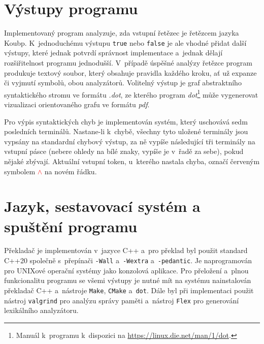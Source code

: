 \section{Výstupy programu}
Implementovaný program analyzuje, zda vstupní řetězec je řetězcem jazyka Koubp.
K~jednoduchému výstupu \texttt{true} nebo \texttt{false} je ale vhodné přidat další výstupy, které jednak potvrdí správnost implementace a~jednak dělají rozšiřitelnost programu jednodušší.
V~případě úspěšné analýzy řetězce program produkuje textový soubor, který obsahuje pravidla každého kroku, ať už expanze či vyjmutí symbolů, obou analyzátorů.
Volitelný výstup je graf abstraktního syntaktického stromu ve formátu \emph{.dot}, ze kterého program \emph{dot}\footnote{Manuál k~programu k~dispozici na \href{https://linux.die.net/man/1/dot}{https://linux.die.net/man/1/dot}.} může vygenerovat vizualizaci orientovaného grafu ve formátu \emph{pdf}.

Pro výpis syntaktických chyb je implementován systém, který uschovává sedm posledních terminálů.
Nastane-li k~chybě, všechny tyto uložené terminály jsou vypsány na standardní chybový výstup, za ně vypíše následující tři terminály na vstupní pásce (nebere ohledy na bílé znaky, vypíše je v~řadě za sebe), pokud nějaké zbývají.
Aktuální vstupní token, u~kterého nastala chyba, označí červeným symbolem \textcolor{red}{$\wedge$} na novém řádku.

\section{Jazyk, sestavovací systém a spuštění programu}
Překladač je implementován v~jazyce C++ a~pro překlad byl použit standard C++20 společně s~přepínači \texttt{-Wall} a~\texttt{-Wextra} a~\texttt{-pedantic}.
Je naprogramován pro UNIXové operační systémy jako konzolová aplikace. 
Pro přeložení a~plnou funkcionalitu programu se všemi výstupy je nutné mít na systému nainstalován překladač C++ a~nástroje \texttt{Make}, \texttt{CMake} a~\texttt{dot}.
Dále byl při implementaci použit nástroj \texttt{valgrind} pro analýzu správy paměti a~nástroj \texttt{Flex} pro generování lexikálního analyzátoru.

